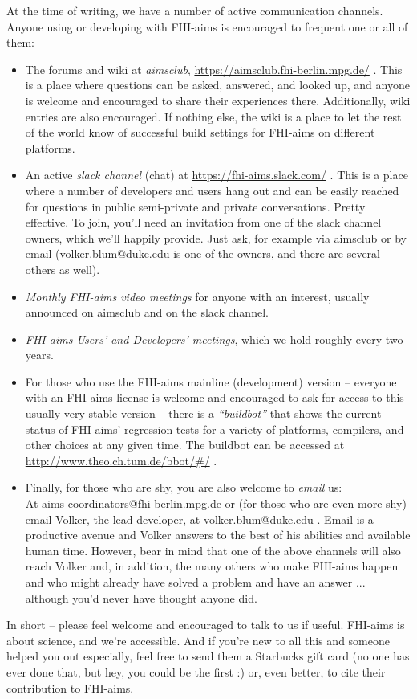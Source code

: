 At the time of writing, we have a number of active communication
channels. Anyone using or developing with FHI-aims is encouraged
to frequent one or all of them:
\begin{itemize}
  \item The forums and wiki at \textit{aimsclub},
    \url{https://aimsclub.fhi-berlin.mpg.de/} . This is a place where
    questions can be asked, answered, and looked up, and anyone is
    welcome and encouraged to share their experiences
    there. Additionally, wiki entries are also encouraged. If nothing
    else, the wiki is a place to let the rest of the world know of
    successful build settings for FHI-aims on different platforms.
  \item An active \textit{slack channel} (chat) at
    \url{https://fhi-aims.slack.com/} . This is a place where a number of
    developers and users hang out and can 
    be easily reached for questions in public semi-private and private
    conversations. Pretty effective. To join, you'll need an invitation from one of the
    slack channel owners, which we'll happily provide. Just ask, for
    example via aimsclub or by email (volker.blum@duke.edu is one
    of the owners, and there are several others as well).
  \item \textit{Monthly FHI-aims video meetings} for anyone with an
    interest, usually announced on aimsclub and on the slack channel. 
  \item \textit{FHI-aims Users' and Developers' meetings}, which we hold
    roughly every two years.
  \item For those who use the FHI-aims mainline (development)
    version -- everyone with an FHI-aims license is welcome and
    encouraged to ask for access to this usually very stable version
    -- there is a \textit{``buildbot''} that shows the current status
    of FHI-aims' regression tests for a variety of platforms,
    compilers, and other choices at any given time. The buildbot can
    be accessed at \url{http://www.theo.ch.tum.de/bbot/\#/} .
  \item Finally, for those who are shy, you are also welcome to \textit{email}
    us: \\
    At aims-coordinators@fhi-berlin.mpg.de or (for those who are
    even more shy) email Volker, the lead developer, at
    volker.blum@duke.edu . Email is a productive avenue and Volker
    answers to the best of his abilities and available human time. However,
    bear in mind that one of the above channels will also reach Volker
    and, in addition, the many others who make FHI-aims happen and who
    might already have solved a  problem and have an answer
    ... although you'd never have thought anyone did. 
\end{itemize}
In short -- please feel welcome and encouraged to talk to us if
useful. FHI-aims is about science, and we're accessible. And if you're
new to all this and someone helped you out especially, feel free to send
them a Starbucks gift card (no one has ever done that, but hey, you
could be the first :) or, even
better, to cite their contribution to FHI-aims. 
